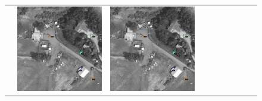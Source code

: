 \begin{figure}[h!]
\begin{tabularx}{\textwidth}{c|*{9}{X}}
    & \includegraphics[trim={730pt 220pt 200pt 720pt},clip,width=\linewidth]{images/015Results/03ablation/comp_images/blue/523.png}
    & \includegraphics[trim={850pt 110pt 80pt 830pt},clip,width=\linewidth]{images/015Results/03ablation/comp_images/blue/523.png}

\end{tabularx}
\end{figure}
